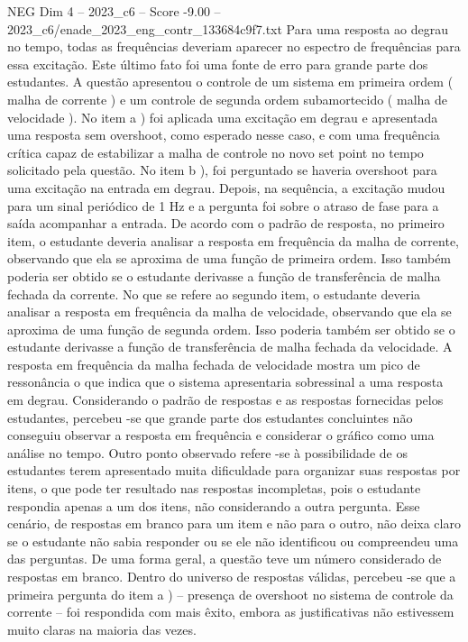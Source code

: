 \begin{textsample}{NEG Dim 4 – 2023\_c6 – Score -9.00 – 2023\_c6/enade\_2023\_eng\_contr\_133684c9f7.txt}
Para uma resposta ao degrau no tempo, todas as frequências deveriam aparecer no espectro de frequências para essa excitação.
Este último fato foi uma fonte de erro para grande parte dos estudantes.
A questão apresentou o controle de um sistema em primeira ordem ( malha de corrente ) e um controle de segunda ordem subamortecido ( malha de velocidade ).
No item a ) foi aplicada uma excitação em degrau e apresentada uma resposta sem overshoot, como esperado nesse caso, e com uma frequência crítica capaz de estabilizar a malha de controle no novo set point no tempo solicitado pela questão.
No item b ), foi perguntado se haveria overshoot para uma excitação na entrada em degrau.
Depois, na sequência, a excitação mudou para um sinal periódico de 1 Hz e a pergunta foi sobre o atraso de fase para a saída acompanhar a entrada.
De acordo com o padrão de resposta, no primeiro item, o estudante deveria analisar a resposta em frequência da malha de corrente, observando que ela se aproxima de uma função de primeira ordem.
Isso também poderia ser obtido se o estudante derivasse a função de transferência de malha fechada da corrente.
No que se refere ao segundo item, o estudante deveria analisar a resposta em frequência da malha de velocidade, observando que ela se aproxima de uma função de segunda ordem.
Isso poderia também ser obtido se o estudante derivasse a função de transferência de malha fechada da velocidade.
A resposta em frequência da malha fechada de velocidade mostra um pico de ressonância o que indica que o sistema apresentaria sobressinal a uma resposta em degrau.
Considerando o padrão de respostas e as respostas fornecidas pelos estudantes, percebeu -se que grande parte dos estudantes concluintes não conseguiu observar a resposta em frequência e considerar o gráfico como uma análise no tempo.
Outro ponto observado refere -se à possibilidade de os estudantes terem apresentado muita dificuldade para organizar suas respostas por itens, o que pode ter resultado nas respostas incompletas, pois o estudante respondia apenas a um dos itens, não considerando a outra pergunta.
Esse cenário, de respostas em branco para um item e não para o outro, não deixa claro se o estudante não sabia responder ou se ele não identificou ou compreendeu uma das perguntas.
De uma forma geral, a questão teve um número considerado de respostas em branco.
Dentro do universo de respostas válidas, percebeu -se que a primeira pergunta do item a ) – presença de overshoot no sistema de controle da corrente – foi respondida com mais êxito, embora as justificativas não estivessem muito claras na maioria das vezes.

\end{textsample}
